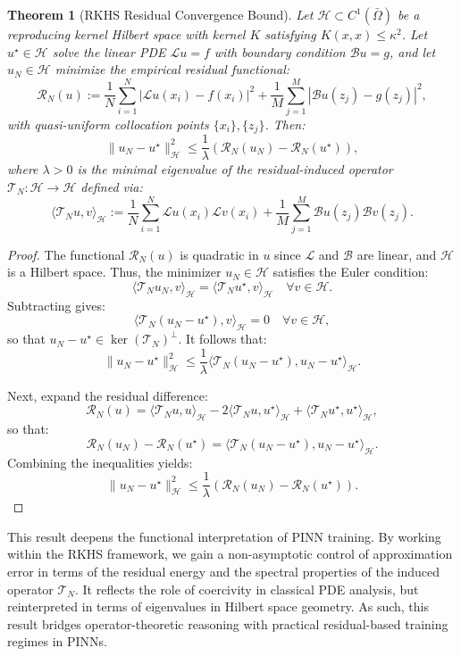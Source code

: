 \documentclass[11pt, a4paper]{article}
\newtheorem{thm}{Theorem}
\begin{document}
\begin{thm}[RKHS Residual Convergence Bound]
\label{thm:rkhs_convergence}
Let $\mathcal{H} \subset C^1(\bar{\Omega})$ be a reproducing kernel Hilbert space with kernel $K$ satisfying $K(x,x) \leq \kappa^2$. Let $u^\star \in \mathcal{H}$ solve the linear PDE $\mathcal{L} u = f$ with boundary condition $\mathcal{B} u = g$, and let $u_N \in \mathcal{H}$ minimize the empirical residual functional:
\[
\mathcal{R}_N(u) := \frac{1}{N} \sum_{i=1}^N |\mathcal{L}u(x_i) - f(x_i)|^2 + \frac{1}{M} \sum_{j=1}^M |\mathcal{B}u(z_j) - g(z_j)|^2,
\]
with quasi-uniform collocation points $\{x_i\}, \{z_j\}$. Then:
\[
\| u_N - u^\star \|_{\mathcal{H}}^2 \leq \frac{1}{\lambda} \left( \mathcal{R}_N(u_N) - \mathcal{R}_N(u^\star) \right),
\]
where $\lambda > 0$ is the minimal eigenvalue of the residual-induced operator $\mathcal{T}_N: \mathcal{H} \to \mathcal{H}$ defined via:
\[
\langle \mathcal{T}_N u, v \rangle_{\mathcal{H}} := \frac{1}{N} \sum_{i=1}^N \mathcal{L}u(x_i)\mathcal{L}v(x_i) + \frac{1}{M} \sum_{j=1}^M \mathcal{B}u(z_j)\mathcal{B}v(z_j).
\]
\end{thm}

\begin{proof}
The functional $\mathcal{R}_N(u)$ is quadratic in $u$ since $\mathcal{L}$ and $\mathcal{B}$ are linear, and $\mathcal{H}$ is a Hilbert space. Thus, the minimizer $u_N \in \mathcal{H}$ satisfies the Euler condition:
\[
\langle \mathcal{T}_N u_N, v \rangle_{\mathcal{H}} = \langle \mathcal{T}_N u^\star, v \rangle_{\mathcal{H}} \quad \forall v \in \mathcal{H}.
\]
Subtracting gives:
\[
\langle \mathcal{T}_N(u_N - u^\star), v \rangle_{\mathcal{H}} = 0 \quad \forall v \in \mathcal{H},
\]
so that $u_N - u^\star \in \ker(\mathcal{T}_N)^\perp$. It follows that:
\[
\| u_N - u^\star \|_{\mathcal{H}}^2 \leq \frac{1}{\lambda} \langle \mathcal{T}_N(u_N - u^\star), u_N - u^\star \rangle_{\mathcal{H}}.
\]

Next, expand the residual difference:
\[
\mathcal{R}_N(u) = \langle \mathcal{T}_N u, u \rangle_{\mathcal{H}} - 2\langle \mathcal{T}_N u, u^\star \rangle_{\mathcal{H}} + \langle \mathcal{T}_N u^\star, u^\star \rangle_{\mathcal{H}},
\]
so that:
\[
\mathcal{R}_N(u_N) - \mathcal{R}_N(u^\star) = \langle \mathcal{T}_N(u_N - u^\star), u_N - u^\star \rangle_{\mathcal{H}}.
\]
Combining the inequalities yields:
\[
\| u_N - u^\star \|_{\mathcal{H}}^2 \leq \frac{1}{\lambda} \left( \mathcal{R}_N(u_N) - \mathcal{R}_N(u^\star) \right).
\]
\end{proof}

\vspace{1em}
This result deepens the functional interpretation of PINN training. By working within the RKHS framework, we gain a non-asymptotic control of approximation error in terms of the residual energy and the spectral properties of the induced operator $\mathcal{T}_N$. It reflects the role of coercivity in classical PDE analysis, but reinterpreted in terms of eigenvalues in Hilbert space geometry. As such, this result bridges operator-theoretic reasoning with practical residual-based training regimes in PINNs.
\end{document}
